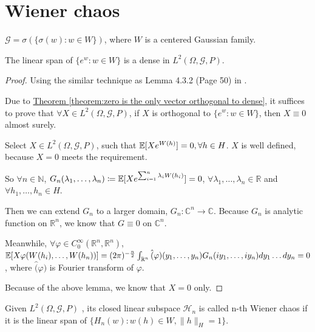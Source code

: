 \chapter{Wiener chaos}

\begin{definition}
$\mathcal{G} = \sigma(\{\sigma(w): w \in W \})$, where $W$ is a centered Gaussian family. 
\end{definition}

\begin{lemma}
\label{lemma:linear span is dense}
The linear span of $\{e^{w}: w \in W\}$ is a dense in $L^2(\Omega, \mathcal{G}, P)$. 
\end{lemma}

\begin{proof}
Using the similar technique as Lemma 4.3.2 (Page 50) in
\cite{StochasticDifferentialEquationsAnIntroductionwithApplications}. 

Due to \hyperref[theorem:zero is the only vector orthogonal to dense]
{Theorem \ref*{theorem:zero is the only vector orthogonal to dense}}, it suffices to prove that $\forall X \in L^2(\Omega, \mathcal{G}, P)$, if $X$ is orthogonal to $\{e^{w}: w \in W\}$, then $X \equiv 0$ almost surely. 

Select $X \in L^2(\Omega, \mathcal{G}, P)$, such that $\operatorname{\mathbb{E}}[Xe^{W(h)}]=0, \forall h \in H$. $X$ is well defined, because $X = 0$ meets the requirement. 

So $\forall n \in \mathbb{N}$, 
$G_n(\lambda_1, \dots, \lambda_n) \coloneqq 
\operatorname{\mathbb{E}}[X e^{\sum_{i=1}^{n} \lambda_i W(h_i) }] = 0$, 
$\forall \lambda_1, \dots, \lambda_n \in \mathbb{R}$ and 
$\forall h_1, \dots, h_n \in H$. 

Then we can extend $G_n$ to a larger domain, 
$G_n: \mathbb{C}^n \to \mathbb{C}$. Because $G_n$ is analytic function on $\mathbb{R}^n$, we know that $G \equiv 0$ on $\mathbb{C}^n$. 

Meanwhile, $\forall \varphi \in C_{0}^{\infty}(\mathbb{R}^n, \mathbb{R}^n)$, 
$\operatorname{\mathbb{E}}[X\varphi(W(h_i), \dots, W(h_n))] \\
= (2\pi)^{-\frac{n}{2}} 
\int_{\mathbb{R}^n} \hat(\varphi)(y_1, \dots, y_n) G_n(iy_1, \dots, iy_n) dy_1\dots dy_n = 0$, 
where $\hat(\varphi)$ is Fourier transform of $\varphi$. 

Because of the above lemma, we know that $X = 0$ only. 
\end{proof}

\begin{definition}
Given $L^2(\Omega, \mathcal{G}, P)$
, its closed linear subspace $\mathcal{H}_n$ is called n-th Wiener chaos
if it is the linear span of 
$\{H_n(w): w(h) \in W, \lVert h \rVert_{H} = 1\}$. 
\end{definition}

